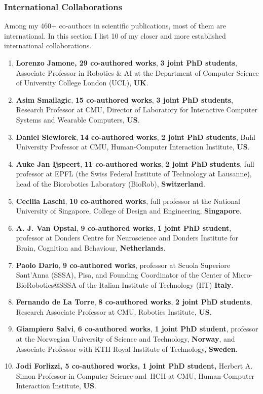 \documentclass[
]{article}
\begin{document}
\subsubsection*{International
Collaborations}\label{international-collaborations}

Among my 460+ co-authors in scientific publications, most of them are
international. In this section I list 10 of my closer and more
established international collaborations.

\begin{enumerate}
\def\labelenumi{\arabic{enumi}.}
\item
  \textbf{Lorenzo Jamone, 29 co-authored works}, \textbf{3 joint PhD
  students}, Associate Professor in Robotics \& AI at the Department of
  Computer Science of University College London (UCL), \textbf{UK}.
\item
  \textbf{Asim Smailagic}, \textbf{15 co-authored works}, \textbf{3
  joint PhD students}, Research Professor at CMU, Director of Laboratory
  for Interactive Computer Systems and Wearable Computers, \textbf{US}.
\item
  \textbf{Daniel Siewiorek}, \textbf{14 co-authored works}, \textbf{2
  joint PhD students}, Buhl University Professor at CMU, Human-Computer
  Interaction Institute, \textbf{US}.
\item
  \textbf{Auke Jan Ijspeert}, \textbf{11 co-authored works}, \textbf{2
  joint PhD} \textbf{students}, full professor at EPFL (the Swiss
  Federal Institute of Technology at Lausanne), head of the Biorobotics
  Laboratory (BioRob), \textbf{Switzerland}.
\item
  \textbf{Cecilia Laschi}, \textbf{10 co-authored works}, full professor
  at the National University of Singapore, College of Design and
  Engineering, \textbf{Singapore}.
\item
  \textbf{A. J. Van Opstal}, \textbf{9 co-authored works}, \textbf{1
  joint PhD student}, professor at Donders Centre for Neuroscience and
  Donders Institute for Brain, Cognition and Behaviour,
  \textbf{Netherlands}.
\item
  \textbf{Paolo Dario}, \textbf{9 co-authored works}, professor at
  Scuola Superiore Sant'Anna (SSSA), Pisa, and Founding Coordinator of
  the Center of Micro-BioRobotics@SSSA of the Italian Institute of
  Technology (IIT) \textbf{Italy}.
\item
  \textbf{Fernando de La Torre}, \textbf{8 co-authored works}, \textbf{2
  joint PhD students}, Research Associate Professor at CMU, Robotics
  Institute, \textbf{US}.
\item
  \textbf{Giampiero Salvi}, \textbf{6 co-authored works}, \textbf{1
  joint PhD student}, professor at the Norwegian University of Science
  and Technology, \textbf{Norway}, and Associate Professor with KTH
  Royal Institute of Technology, \textbf{Sweden}.
\item
  \textbf{Jodi Forlizzi, 5 co-authored works, 1 joint PhD student,}
  Herbert A. Simon Professor in Computer Science and~HCII at CMU,
  Human-Computer Interaction Institute, \textbf{US}.
\end{enumerate}
\end{document}
